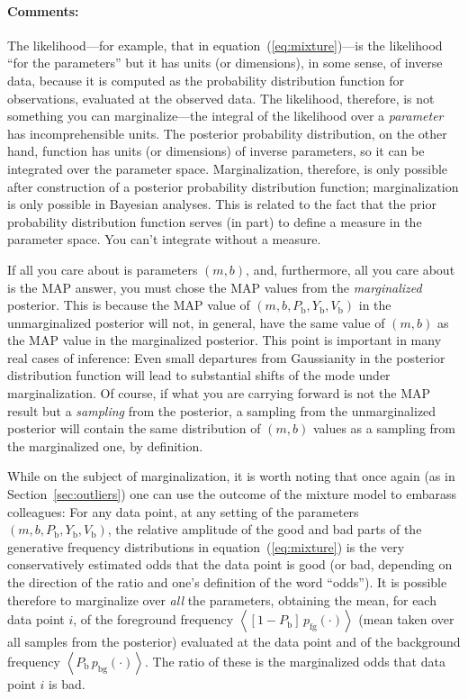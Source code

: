 \documentclass[12pt,twoside]{article}
\newcommand{\sectionname}{Section}
\newcommand{\commentsname}{Comments}
\newenvironment{comments}{\paragraph{\commentsname:}}{}
\newcommand{\pfg}{p_{\mathrm{fg}}}
\newcommand{\pbg}{p_{\mathrm{bg}}}
\newcommand{\Pbad}{P_{\mathrm{b}}}
\newcommand{\Ybad}{Y_{\mathrm{b}}}
\newcommand{\Vbad}{V_{\mathrm{b}}}
\begin{document}
\begin{comments}
The likelihood---for example, that in equation~(\ref{eq:mixture})---is
the likelihood ``for the parameters'' but it has units (or
dimensions), in some sense, of inverse data, because it is computed as
the probability distribution function for observations, evaluated at
the observed data.  The likelihood, therefore, is not something you
can marginalize---the integral of the likelihood over a
\emph{parameter} has incomprehensible units.  The posterior
probability distribution, on the other hand, function has units (or
dimensions) of inverse parameters, so it can be integrated over the
parameter space.  Marginalization, therefore, is only possible after
construction of a posterior probability distribution function;
marginalization is only possible in Bayesian analyses.  This is
related to the fact that the prior probability distribution function
serves (in part) to define a measure in the parameter space.  You
can't integrate without a measure.

If all you care about is parameters $(m,b)$, and, furthermore, all you
care about is the MAP answer, you must chose the MAP values from the
\emph{marginalized} posterior.  This is because the MAP value of
$(m,b,\Pbad,\Ybad,\Vbad)$ in the unmarginalized posterior will not, in
general, have the same value of $(m,b)$ as the MAP value in the
marginalized posterior.  This point is important in many real cases of
inference: Even small departures from Gaussianity in the posterior
distribution function will lead to substantial shifts of the mode
under marginalization.  Of course, if what you are carrying forward is
not the MAP result but a \emph{sampling} from the posterior, a
sampling from the unmarginalized posterior will contain the same
distribution of $(m,b)$ values as a sampling from the marginalized
one, by definition.

While on the subject of marginalization, it is worth noting that once
again (as in \sectionname~\ref{sec:outliers}) one can use the outcome
of the mixture model to embarass colleagues: For any data point, at
any setting of the parameters $(m,b,\Pbad,\Ybad,\Vbad)$, the relative
amplitude of the good and bad parts of the generative frequency
distributions in equation~(\ref{eq:mixture}) is the very
conservatively estimated odds that the data point is good (or bad,
depending on the direction of the ratio and one's definition of the
word ``odds'').  It is possible therefore to marginalize over
\emph{all} the parameters, obtaining the mean, for each data point
$i$, of the foreground frequency $\left<[1-\Pbad]\,\pfg(\cdot)\right>$
(mean taken over all samples from the posterior) evaluated at the data
point and of the background frequency
$\left<\Pbad\,\pbg(\cdot)\right>$.  The ratio of these is the
marginalized odds that data point $i$ is bad.


\end{comments}
\end{document}
